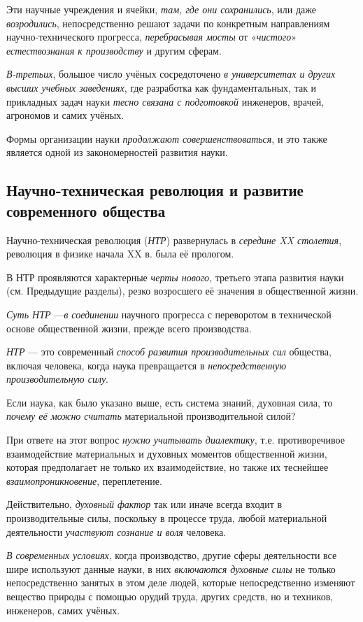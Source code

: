 \documentclass[a4paper,14pt,russian]{extreport}
\begin{document}
Эти научные учреждения и ячейки, \emph{там, где они сохранились}, или даже \emph{возродились}, непосредственно решают задачи по конкретным направлениям научно-технического прогресса, \emph{перебрасывая мосты} от «\emph{чистого}» \emph{естествознания к производству} и другим сферам.

\emph{В-третьих}, большое число учёных сосредоточено \emph{в университетах и других высших учебных заведениях}, где разработка как фундаментальных, так и прикладных задач науки \emph{тесно связана с подготовкой} инженеров, врачей, агрономов и самих учёных.

Формы организации науки \emph{продолжают совершенствоваться}, и это также является одной из закономерностей развития науки.

\subsection{Научно-техническая революция и развитие современного общества}

Научно-техническая революция (\emph{НТР}) развернулась в \emph{середине XX столетия}, революция в физике начала XX в. была её прологом.

В НТР проявляются характерные \emph{черты нового}, третьего этапа развития науки (см. Предыдущие разделы), резко возросшего её значения в общественной жизни.

\emph{Суть НТР} ---\emph{в соединении} научного прогресса с переворотом в технической основе общественной жизни, прежде всего производства.

\emph{НТР} --- это современный \emph{способ развития производительных сил} общества, включая человека, когда наука превращается в \emph{непосредственную производительную силу}.

Если наука, как было указано выше, есть система знаний, духовная сила, то \emph{почему её можно считать} материальной производительной силой?

При ответе на этот вопрос \emph{нужно учитывать диалектику}, т.е. противоречивое взаимодействие материальных и духовных моментов общественной жизни, которая предполагает не только их взаимодействие, но также их теснейшее \emph{взаимопроникновение}, переплетение.

Действительно, \emph{духовный фактор} так или иначе всегда входит в производительные силы, поскольку в процессе труда, любой материальной деятельности \emph{участвуют сознание и воля} человека.

\emph{В современных условиях}, когда производство, другие сферы деятельности все шире используют данные науки, в них \emph{включаются духовные силы} не только непосредственно занятых в этом деле людей, которые непосредственно изменяют вещество природы с помощью орудий труда, других средств, но и техников, инженеров, самих учёных.
\end{document}
